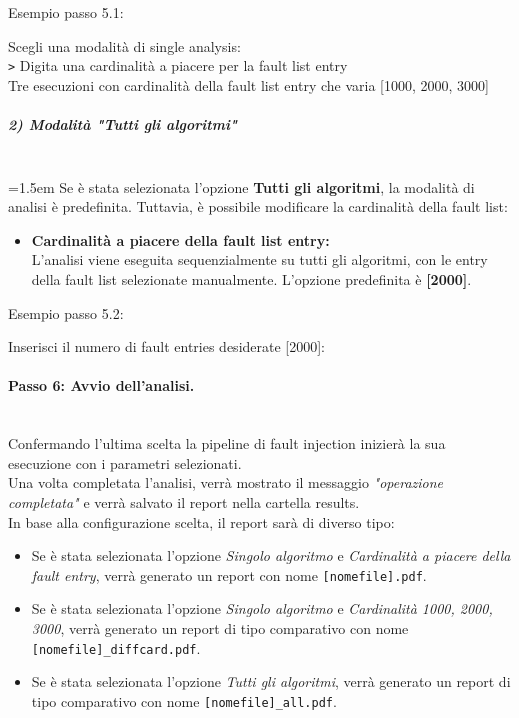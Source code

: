 \documentclass{article}
\begin{document}
Esempio passo 5.1: 
\begin{tcolorbox}[colback=black, coltext=white, sharp corners, boxrule=0.5mm, width=\textwidth]
Scegli una modalità di single analysis: \\
\texttt{>} Digita una cardinalità a piacere per la fault list entry \\
\hspace{2.5em}Tre esecuzioni con cardinalità della fault list entry che varia [1000, 2000, 3000]
\end{tcolorbox}

\subparagraph{2) Modalità "Tutti gli algoritmi"}\leavevmode\\
\hangindent=1.5em   
Se è stata selezionata l'opzione \textbf{Tutti gli algoritmi}, la modalità di analisi è predefinita. Tuttavia, è possibile modificare la cardinalità della fault list:
\begin{itemize}
    \item \textbf{Cardinalità a piacere della fault list entry:}\\
    L'analisi viene eseguita sequenzialmente su tutti gli algoritmi, con le entry della fault list selezionate manualmente. L'opzione predefinita è \textbf{[2000]}.
\end{itemize}

Esempio passo 5.2:
\begin{tcolorbox}[colback=black, coltext=white, sharp corners, boxrule=0.5mm, width=\textwidth]
Inserisci il numero di fault entries desiderate [2000]:
\end{tcolorbox}



\paragraph{Passo 6: Avvio dell'analisi.}\leavevmode\\
Confermando l'ultima scelta la pipeline di fault injection inizierà la sua esecuzione con i parametri selezionati.\\
Una volta completata l'analisi, verrà mostrato il messaggio \textit{"operazione completata"} e verrà salvato il report nella cartella results. \\
In base alla configurazione scelta, il report sarà di diverso tipo:
\begin{itemize}
    \item Se è stata selezionata l'opzione \textit{Singolo algoritmo} e \textit{Cardinalità a piacere della fault entry}, verrà generato un report con nome \texttt{[nomefile].pdf}.
    \item Se è stata selezionata l'opzione \textit{Singolo algoritmo} e \textit{Cardinalità 1000, 2000, 3000}, verrà generato un report di tipo comparativo con nome \texttt{[nomefile]\_diffcard.pdf}.
    \item Se è stata selezionata l'opzione \textit{Tutti gli algoritmi}, verrà generato un report di tipo comparativo con nome \texttt{[nomefile]\_all.pdf}.
\end{itemize}
\end{document}
